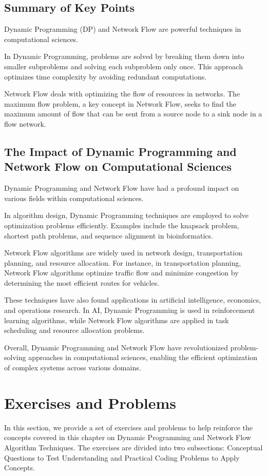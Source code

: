 \documentclass[12pt]{book} %
\begin{document}
\subsection{Summary of Key Points}
Dynamic Programming (DP) and Network Flow are powerful techniques in computational sciences.

In Dynamic Programming, problems are solved by breaking them down into smaller subproblems and solving each subproblem only once. This approach optimizes time complexity by avoiding redundant computations.

Network Flow deals with optimizing the flow of resources in networks. The maximum flow problem, a key concept in Network Flow, seeks to find the maximum amount of flow that can be sent from a source node to a sink node in a flow network.

\subsection{The Impact of Dynamic Programming and Network Flow on Computational Sciences}
Dynamic Programming and Network Flow have had a profound impact on various fields within computational sciences.

In algorithm design, Dynamic Programming techniques are employed to solve optimization problems efficiently. Examples include the knapsack problem, shortest path problems, and sequence alignment in bioinformatics.

Network Flow algorithms are widely used in network design, transportation planning, and resource allocation. For instance, in transportation planning, Network Flow algorithms optimize traffic flow and minimize congestion by determining the most efficient routes for vehicles.

These techniques have also found applications in artificial intelligence, economics, and operations research. In AI, Dynamic Programming is used in reinforcement learning algorithms, while Network Flow algorithms are applied in task scheduling and resource allocation problems.

Overall, Dynamic Programming and Network Flow have revolutionized problem-solving approaches in computational sciences, enabling the efficient optimization of complex systems across various domains.

\section{Exercises and Problems}
In this section, we provide a set of exercises and problems to help reinforce the concepts covered in this chapter on Dynamic Programming and Network Flow Algorithm Techniques. The exercises are divided into two subsections: Conceptual Questions to Test Understanding and Practical Coding Problems to Apply Concepts.
\end{document}
